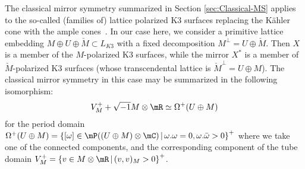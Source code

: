 \documentclass[10pt,a4paper]{amsart}
\numberwithin{equation}{section}
\begin{document}
The classical mirror symmetry summarized in Section \ref{sec:Classical-MS} applies to the so-called (families of) lattice polarized K3 surfaces replacing the K\"ahler cone with the ample cones~\cite{Do}. In our case here, we consider a primitive lattice embedding $M\oplus U\oplus\check{M}\subset L_{K3}$ with a fixed decomposition $M^{\perp}=U\oplus\check{M}$. Then $X$ is a member of the $M$-polarized K3 surfaces, while the mirror $X^{*}$ is a member of $\check{M}$-polarized K3 surfaces (whose transcendental lattice is $\check{M}^{\perp}=U\oplus M$). The classical mirror symmetry in this case may be summarized in the following isomorphism:
\begin{gather*}
V_{M}^{+}+\sqrt{-1}M\otimes\mR\simeq\Omega^{+}(U\oplus M)
\end{gather*}
for the period domain $\Omega^{+}(U\oplus M)=\left\{ [\omega]\in\mP((U\oplus M)\otimes\mC)\,|\,\omega.\omega=0,\omega.\bar{\omega}>0\right\} ^{+}$ where we take one of the connected components, and the corresponding component of the tube domain $V_{M}^{+}=\left\{ v\in M\otimes\mR\,|\,(v,v)_{M}>0\right\} ^{+}$.
\end{document}
